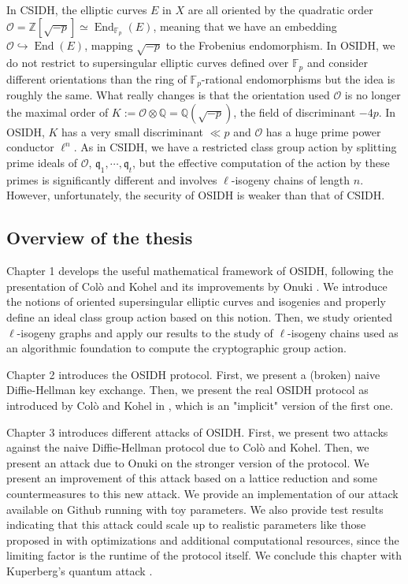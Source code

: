 \documentclass[a4paper,10pt,notitlepage]{report}
\theoremstyle{definition}
\theoremstyle{plain}
\theoremstyle{definition}
\newcommand{\Z}{\mathbb{Z}}
\newcommand{\Q}{\mathbb{Q}}
\newcommand{\F}{\mathbb{F}}
\newcommand{\mO}{\mathcal{O}}
\renewcommand{\(}{\left(}
\renewcommand{\)}{\right)}
\newcommand{\mf}[1]{\mathfrak{#1}}
\DeclareMathOperator{\End}{End}
\begin{document}
In CSIDH, the elliptic curves $E$ in $X$ are all oriented by the quadratic order $\mO=\Z[\sqrt{-p}]\simeq\End_{\F_p}(E)$, meaning that we have an embedding $\mO\hookrightarrow \End(E)$, mapping $\sqrt{-p}$ to the Frobenius endomorphism.  In OSIDH, we do not restrict to supersingular elliptic curves defined over $\F_p$ and consider different orientations than the ring of $\F_p$-rational endomorphisms but the idea is roughly the same. What really changes is that the orientation used $\mO$ is no longer the maximal order of $K:=\mO\otimes\Q=\Q(\sqrt{-p})$, the field of discriminant $-4p$. In OSIDH, $K$ has a very small discriminant $\ll p$ and $\mO$ has a huge prime power conductor $\ell^n$. As in CSIDH, we have a restricted class group action by splitting prime ideals of $\mO$, $\mf{q}_1, \cdots, \mf{q}_t$, but the effective computation of the action by these primes is significantly different and involves $\ell$-isogeny chains of length $n$. However, unfortunately, the security of OSIDH is weaker than that of CSIDH.

\subsection*{Overview of the thesis}

Chapter 1 develops the useful mathematical framework of OSIDH, following the presentation of Col\`{o} and Kohel \cite{OSIDH} and its improvements by Onuki \cite{Onuki}. We introduce the notions of oriented supersingular elliptic curves and isogenies and properly define an ideal class group action based on this notion. Then, we study oriented $\ell$-isogeny graphs and apply our results to the study of $\ell$-isogeny chains used as an algorithmic foundation to compute the cryptographic group action.

Chapter 2 introduces the OSIDH protocol. First, we present a (broken) naive Diffie-Hellman key exchange. Then, we present the real OSIDH protocol as introduced by Col\`{o} and Kohel in \cite[§ 5.2]{OSIDH}, which is an "implicit" version of the first one.

Chapter 3 introduces different attacks of OSIDH. First, we present two attacks against the naive Diffie-Hellman protocol due to Col\`{o} and Kohel.  Then, we present an attack due to Onuki \cite[§ 6.3]{Onuki} on the stronger version of the protocol. We present an improvement of this attack based on a lattice reduction and some countermeasures to this new attack. We provide an implementation of our attack available on Github \cite{MyGithub} running with toy parameters. We also provide test results indicating that this attack could scale up to realistic parameters like those proposed in \cite[p.434]{OSIDH} with optimizations and additional computational resources, since the limiting factor is the runtime of the protocol itself. We conclude this chapter with Kuperberg's quantum attack \cite{Kuperberg}.
\end{document}
